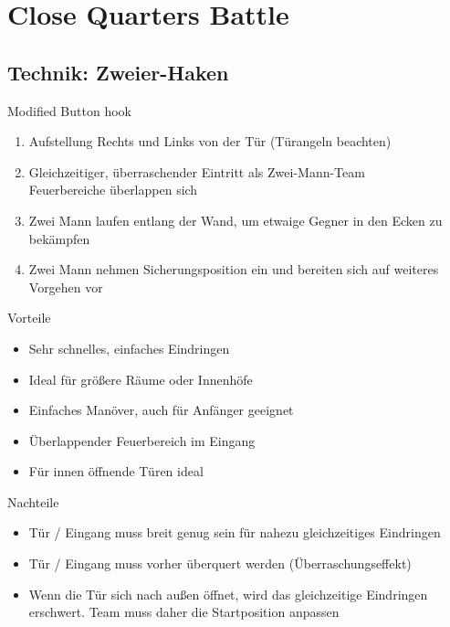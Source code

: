 \pagebreak
\section{Close Quarters Battle}
\label{CQB}
\subsection{Technik: Zweier-Haken}
\begin{center}
	Modified Button hook
\end{center}
\begin{enumerate}
	\item Aufstellung Rechts und Links von der Tür (Türangeln beachten)
	\item Gleichzeitiger, überraschender Eintritt als Zwei-Mann-Team \\
		Feuerbereiche überlappen sich
	\item Zwei Mann laufen entlang der Wand, um etwaige Gegner in den Ecken zu bekämpfen
	\item Zwei Mann nehmen Sicherungsposition ein und bereiten sich auf weiteres Vorgehen vor
 \end{enumerate}        
 Vorteile
 \begin{itemize}
	 \item Sehr schnelles, einfaches Eindringen
	 \item Ideal für größere Räume oder Innenhöfe
	 \item Einfaches Manöver, auch für Anfänger geeignet
	 \item Überlappender Feuerbereich im Eingang
	 \item Für innen öffnende Türen ideal
 \end{itemize}     
  Nachteile
  \begin{itemize}
  	\item Tür / Eingang muss breit genug sein für nahezu gleichzeitiges Eindringen
  	\item Tür / Eingang muss vorher überquert werden (Überraschungseffekt)
  	\item Wenn die Tür sich nach außen öffnet, wird das gleichzeitige Eindringen erschwert. Team muss daher die Startposition anpassen
  \end{itemize}          

